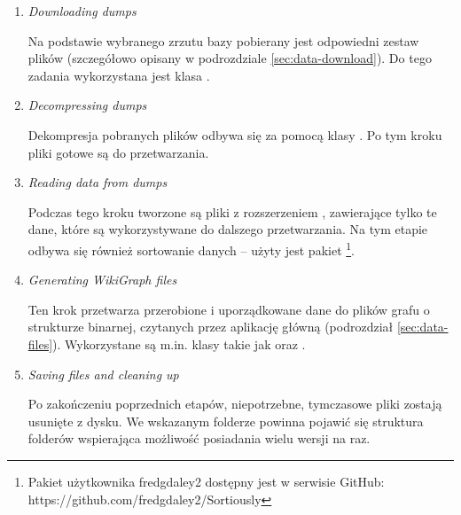 \begin{enumerate}[label=\textbullet]
    \item \textit{Downloading dumps}

    Na podstawie wybranego zrzutu bazy pobierany jest odpowiedni zestaw plików (szczegółowo opisany w podrozdziale \ref{sec:data-download}). Do tego zadania wykorzystana jest klasa .

    \item \textit{Decompressing dumps}

    Dekompresja pobranych plików odbywa się za pomocą klasy . Po tym kroku pliki  gotowe są do przetwarzania.

    \item \textit{Reading data from dumps}

    Podczas tego kroku tworzone są pliki z rozszerzeniem , zawierające tylko te dane, które są wykorzystywane do dalszego przetwarzania. Na tym etapie odbywa się również sortowanie danych – użyty jest pakiet \footnote{Pakiet użytkownika fredgdaley2 dostępny jest w serwisie GitHub: https://github.com/fredgdaley2/Sortiously}.

    \item \textit{Generating WikiGraph files}

    Ten krok przetwarza przerobione i uporządkowane dane do plików grafu o strukturze binarnej, czytanych przez aplikację główną (podrozdział \ref{sec:data-files}). Wykorzystane są m.in. klasy takie jak  oraz .

    \item \textit{Saving files and cleaning up}	

    Po zakończeniu poprzednich etapów, niepotrzebne, tymczasowe pliki zostają usunięte z dysku. We wskazanym folderze powinna pojawić się struktura folderów wspierająca możliwość posiadania wielu wersji na raz.

\end{enumerate}